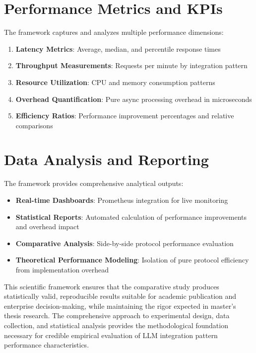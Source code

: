 \section{Performance Metrics and KPIs}

The framework captures and analyzes multiple performance dimensions:

\begin{enumerate}
    \item \textbf{Latency Metrics}: Average, median, and percentile response times
    \item \textbf{Throughput Measurements}: Requests per minute by integration pattern
    \item \textbf{Resource Utilization}: CPU and memory consumption patterns
    \item \textbf{Overhead Quantification}: Pure async processing overhead in microseconds
    \item \textbf{Efficiency Ratios}: Performance improvement percentages and relative comparisons
\end{enumerate}


\section{Data Analysis and Reporting}

The framework provides comprehensive analytical outputs:
\begin{itemize}
    \item \textbf{Real-time Dashboards}: Prometheus integration for live monitoring
    \item \textbf{Statistical Reports}: Automated calculation of performance improvements and overhead impact
    \item \textbf{Comparative Analysis}: Side-by-side protocol performance evaluation
    \item \textbf{Theoretical Performance Modeling}: Isolation of pure protocol efficiency from implementation overhead
\end{itemize}


This scientific framework ensures that the comparative study produces statistically valid, reproducible results suitable for academic publication and enterprise decision-making, while maintaining the rigor expected in master's thesis research. The comprehensive approach to experimental design, data collection, and statistical analysis provides the methodological foundation necessary for credible empirical evaluation of LLM integration pattern performance characteristics.

